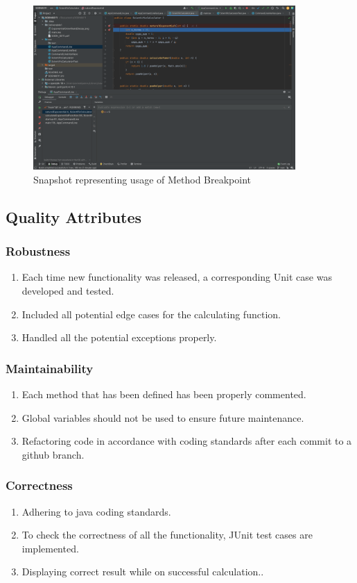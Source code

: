 \documentclass[a4paper,12pt]{report}
\begin{document}
\begin{figure}
\centering
\includegraphics[width=10cm]{MethodBreakpoint.png}
\caption{Snapshot representing usage of Method Breakpoint}
\label{exp}
\end{figure}

\pagebreak

\subsection{Quality Attributes}
\subsubsection{Robustness}
\begin{enumerate}
   \item Each time new functionality was released, a corresponding Unit case was developed and tested.
   \item Included all potential edge cases for the calculating function.
   \item Handled all the potential exceptions properly.
\end{enumerate}
\subsubsection{Maintainability}
\begin{enumerate}
   \item Each method that has been defined has been properly commented.
   \item Global variables should not be used to ensure future maintenance.
   \item Refactoring code in accordance with coding standards after each commit to a github branch.
\end{enumerate}
\subsubsection{Correctness}
\begin{enumerate}
   \item Adhering to java coding standards.
   \item To check the correctness of all the functionality, JUnit test cases are implemented.
   \item Displaying correct result while on successful calculation..
\end{enumerate}
\end{document}
